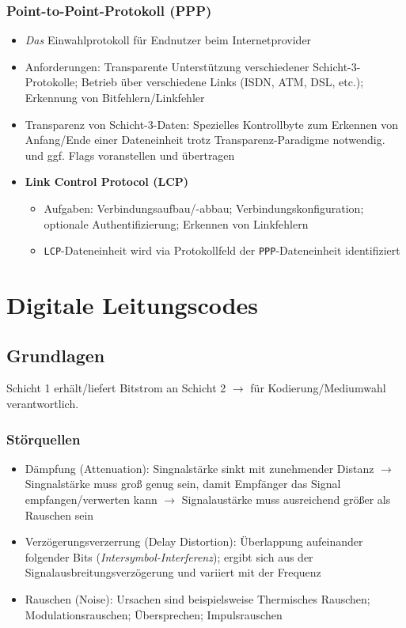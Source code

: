 \subsubsection{Point-to-Point-Protokoll (PPP)}
\begin{itemize}
	\item \textit{Das} Einwahlprotokoll für Endnutzer beim Internetprovider
	\item Anforderungen: Transparente Unterstützung verschiedener Schicht-3-Protokolle; Betrieb über verschiedene Links (ISDN, ATM, DSL, etc.); Erkennung von Bitfehlern/Linkfehler
	\item Transparenz von Schicht-3-Daten: Spezielles Kontrollbyte zum Erkennen von Anfang/Ende einer Dateneinheit trotz Transparenz-Paradigme notwendig. und ggf. Flags voranstellen und übertragen
	\item \textbf{Link Control Protocol (LCP)}
	\begin{itemize}
		\item Aufgaben: Verbindungsaufbau/-abbau; Verbindungskonfiguration; optionale Authentifizierung; Erkennen von Linkfehlern
		\item \texttt{LCP}-Dateneinheit wird via Protokollfeld der \texttt{PPP}-Dateneinheit identifiziert
	\end{itemize}
\end{itemize}



\section{Digitale Leitungscodes}

\subsection{Grundlagen}
Schicht 1 erhält/liefert Bitstrom an Schicht 2 \(\rightarrow\) für Kodierung/Mediumwahl verantwortlich.

\subsubsection{Störquellen}
\begin{itemize}
	\item Dämpfung (Attenuation): Singnalstärke sinkt mit zunehmender Distanz \(\rightarrow\) Singnalstärke muss groß genug sein, damit Empfänger das Signal empfangen/verwerten kann \(\rightarrow\) Signalaustärke muss ausreichend größer als Rauschen sein
	\item Verzögerungsverzerrung (Delay Distortion): Überlappung aufeinander folgender Bits (\textit{Intersymbol-Interferenz}); ergibt sich aus der Signalausbreitungsverzögerung und variiert mit der Frequenz
	\item Rauschen (Noise): Ursachen sind beispielsweise Thermisches Rauschen; Modulationsrauschen; Übersprechen; Impulsrauschen
\end{itemize}

